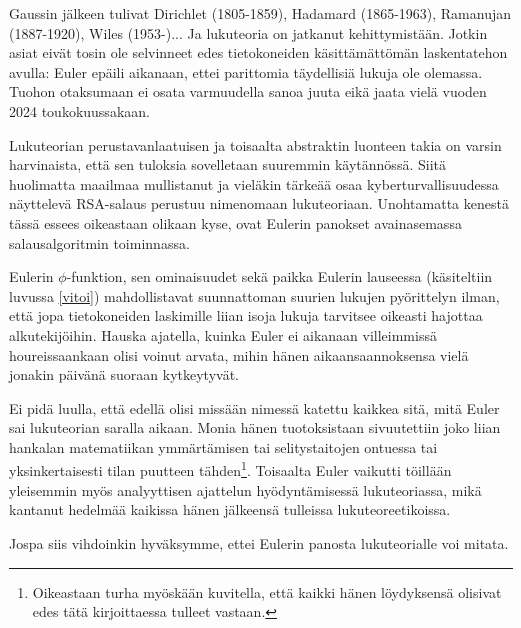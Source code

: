 \documentclass[a4paper,11pt]{article}
\begin{document}
Gaussin jälkeen tulivat Dirichlet (1805-1859), Hadamard (1865-1963), Ramanujan (1887-1920), Wiles (1953-)... Ja lukuteoria on jatkanut kehittymistään. Jotkin asiat eivät tosin ole selvinneet edes tietokoneiden käsittämättömän laskentatehon avulla: Euler epäili aikanaan, ettei parittomia täydellisiä lukuja ole olemassa. Tuohon otaksumaan ei osata varmuudella sanoa juuta eikä jaata vielä vuoden 2024 toukokuussakaan.

Lukuteorian perustavanlaatuisen ja toisaalta abstraktin luonteen takia on varsin harvinaista, että sen tuloksia sovelletaan suuremmin käytännössä. Siitä huolimatta maailmaa mullistanut ja vieläkin tärkeää osaa kyberturvallisuudessa näyttelevä RSA-salaus perustuu nimenomaan lukuteoriaan. Unohtamatta kenestä tässä essees oikeastaan olikaan kyse, ovat Eulerin panokset avainasemassa salausalgoritmin toiminnassa.

Eulerin $\phi$-funktion, sen ominaisuudet sekä paikka Eulerin lauseessa (käsiteltiin luvussa \ref{vitoi}) mahdollistavat suunnattoman suurien lukujen pyörittelyn ilman, että jopa tietokoneiden laskimille liian isoja lukuja tarvitsee oikeasti hajottaa alkutekijöihin. Hauska ajatella, kuinka Euler ei aikanaan villeimmissä houreissaankaan olisi voinut arvata, mihin hänen aikaansaannoksensa vielä jonakin päivänä suoraan kytkeytyvät.

Ei pidä luulla, että edellä olisi missään nimessä katettu kaikkea sitä, mitä Euler sai lukuteorian saralla aikaan. Monia hänen tuotoksistaan sivuutettiin joko liian hankalan matematiikan ymmärtämisen tai selitystaitojen ontuessa tai yksinkertaisesti tilan puutteen tähden\footnote{Oikeastaan turha myöskään kuvitella, että kaikki hänen löydyksensä olisivat edes tätä kirjoittaessa tulleet vastaan.}. Toisaalta Euler vaikutti töillään yleisemmin myös analyyttisen ajattelun hyödyntämisessä lukuteoriassa, mikä kantanut hedelmää kaikissa hänen jälkeensä tulleissa lukuteoreetikoissa.

Jospa siis vihdoinkin hyväksymme, ettei Eulerin panosta lukuteorialle voi mitata.
\end{document}
